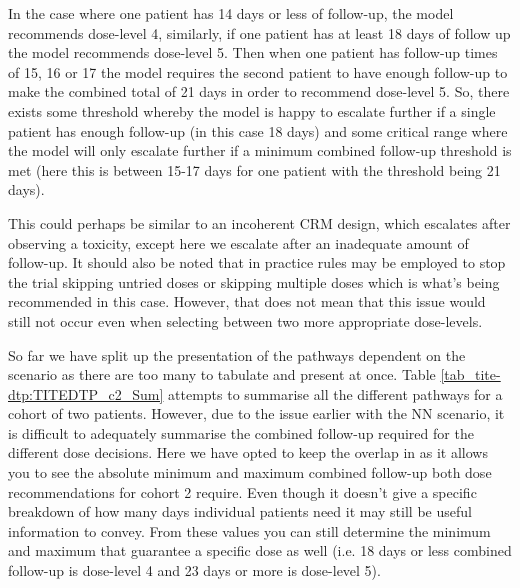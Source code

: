 In the case where one patient has 14 days or less of follow-up, the model recommends dose-level 4, similarly, if one patient has at least 18 days of follow up the model recommends dose-level 5. Then when one patient has follow-up times of 15, 16 or 17 the model requires the second patient to have enough follow-up to make the combined total of 21 days in order to recommend dose-level 5. So, there exists some threshold whereby the model is happy to escalate further if a single patient has enough follow-up (in this case 18 days) and some critical range where the model will only escalate further if a minimum combined follow-up threshold is met (here this is between 15-17 days for one patient with the threshold being 21 days).

This could perhaps be similar to an incoherent CRM design, which escalates after observing a toxicity, except here we escalate after an inadequate amount of follow-up. It should also be noted that in practice rules may be employed to stop the trial skipping untried doses or skipping multiple doses which is what's being recommended in this case. However, that does not mean that this issue would still not occur even when selecting between two more appropriate dose-levels. 

So far we have split up the presentation of the pathways dependent on the scenario as there are too many to tabulate and present at once. Table \ref{tab_tite-dtp:TITEDTP_c2_Sum} attempts to summarise all the different pathways for a cohort of two patients. However, due to the issue earlier with the NN scenario, it is difficult to adequately summarise the combined follow-up required for the different dose decisions. Here we have opted to keep the overlap in as it allows you to see the absolute minimum and maximum combined follow-up both dose recommendations for cohort 2 require. Even though it doesn't give a specific breakdown of how many days individual patients need it may still be useful information to convey. From these values you can still determine the minimum and maximum that guarantee a specific dose as well (i.e. 18 days or less combined follow-up is dose-level 4 and 23 days or more is dose-level 5).

